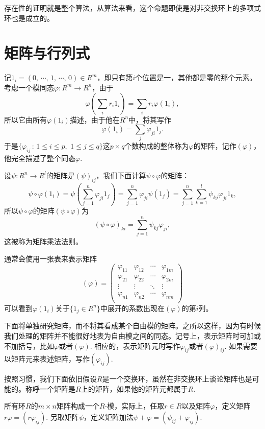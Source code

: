 存在性的证明就是整个算法，从算法来看，这个命题即使是对非交换环上的多项式环也是成立的。

\section{矩阵与行列式}

\para 记$1_i=(0,\,\cdots\!,\,1,\,\cdots\!,\,0)\in R^m$，即只有第$i$个位置是一，其他都是零的那个元素。考虑一个模同态$\varphi:R^m\to R^n$，由于
\[
	\varphi\left(\sum_{i} r_i1_i\right)=\sum_{i} r_i\varphi\left(1_i\right),
\]
所以它由所有$\varphi\left(1_i\right)$描述，由于他在$R^n$中，将其写作
\[
	\varphi\left(1_i\right)=\sum_{j}\varphi_{ji}1_j.
\]
于是$\{\varphi_{ij}\,:\, 1\leq i \leq p,\,\,1\leq j \leq q\}$这$p\times q$个数构成的整体称为$\varphi$的矩阵，记作$(\varphi)$，他完全描述了整个同态$\varphi$.

设$\psi:R^n\to R^l$的矩阵是$(\psi)_{ij}$，我们下面计算$\psi\circ\varphi$的矩阵：
\[
	\psi\circ\varphi(1_i)=\psi\left(\sum_{j=1}^n\varphi_{ji}1_j\right)=\sum_{j=1}^n\varphi_{ji}\psi(1_j)=\sum_{j=1}^n\sum_{k=1}^l\psi_{kj}\varphi_{ji}1_k,
\]
所以$\psi\circ\varphi$的矩阵$(\psi\circ\varphi)$为
\[
	(\psi\circ\varphi)_{ki}=\sum_{j=1}^n\psi_{kj}\varphi_{ji},
\]
这被称为矩阵乘法法则。

\para 通常会使用一张表来表示矩阵
\[
(\varphi)=
\begin{pmatrix}
	\varphi_{11} & \varphi_{12} & \cdots & \varphi_{1m}\\
	\varphi_{21} & \varphi_{22} & \cdots & \varphi_{2m}\\
	\vdots & \vdots & \ddots & \vdots \\
	\varphi_{n1} & \varphi_{n2} & \cdots & \varphi_{nm}\\
\end{pmatrix}
\]
可以看到$\varphi(1_i)$关于$\{1_j\in R^n\}$中展开的系数出现在$(\varphi)$的第$i$列。

下面将单独研究矩阵，而不将其看成某个自由模的矩阵。之所以这样，因为有时候我们处理的矩阵并不能很好地表为自由模之间的同态。记号上，表示矩阵时可加或不加括号，比如$\varphi$或者$(\varphi)$. 相应的，表示矩阵元时写作$\varphi_{ij}$或者$(\varphi)_{ij}$. 如果需要以矩阵元来表述矩阵，写作$(\varphi_{ij})$. 

按照习惯，我们下面依旧假设$R$是一个交换环，虽然在非交换环上谈论矩阵也是可能的。称呼一个矩阵是$R$上的矩阵，如果他的矩阵元都属于$R$.

所有环$R$的$m\times n$矩阵构成一个$R$-模，实际上，任取$r\in R$以及矩阵$\varphi$，定义矩阵$r\varphi= (r\varphi_{ij})$. 另取矩阵$\psi$，定义矩阵加法$\psi+\varphi=(\psi_{ij}+\varphi_{ij})$.

